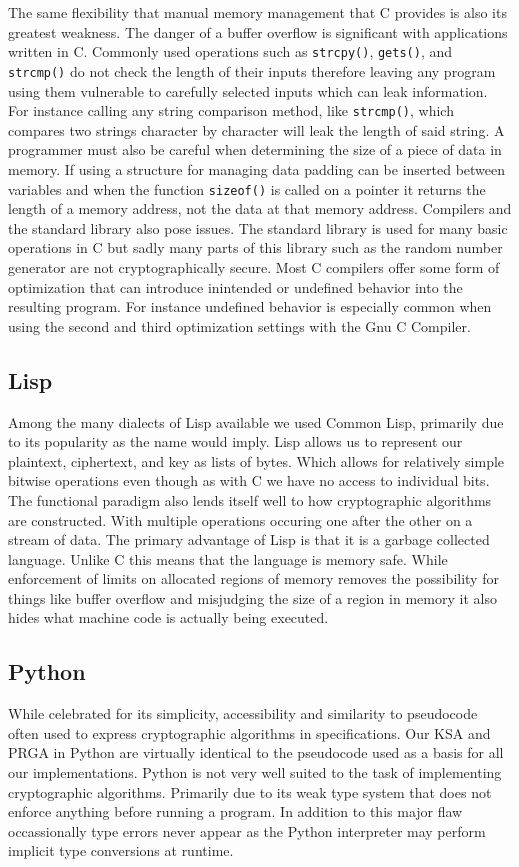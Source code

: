 The same flexibility that manual memory management that C provides is also its greatest weakness. The danger of a buffer overflow is significant with 
applications written in C. Commonly used operations such as \texttt{strcpy()}, \texttt{gets()}, and \texttt{strcmp()} do not check the length of 
their inputs therefore leaving any program using them vulnerable to carefully selected inputs which can leak information. For instance calling any 
string comparison method, like \texttt{strcmp()}, which compares two strings character by character will leak the length of said string. A programmer must also be 
careful when determining the size of a piece of data in memory. If using a structure for managing data padding can be inserted between variables and when the 
function \texttt{sizeof()} is called on a pointer it returns the length of a memory address, not the data at that memory address. Compilers and the standard 
library also pose issues. The standard library is used for many basic operations in C but sadly many parts of this library such as the random number generator 
are not cryptographically secure. Most C compilers offer some form of optimization that can introduce inintended or undefined behavior into the resulting 
program. For instance undefined behavior is especially common when using the second and third optimization settings with the Gnu C Compiler.

\subsection{Lisp}
Among the many dialects of Lisp available we used Common Lisp, primarily due to its popularity as the name would imply. Lisp allows us to represent our plaintext, 
ciphertext, and key as lists of bytes. Which allows for relatively simple bitwise operations even though as with C we have no access to individual bits. The functional
paradigm also lends itself well to how cryptographic algorithms are constructed. With multiple operations occuring one after the other on a stream of data. The primary 
advantage of Lisp is that it is a garbage collected language. Unlike C this means that the language is memory safe. While enforcement of limits on allocated 
regions of memory removes the possibility for things like buffer overflow and misjudging the size of a region in memory it also hides what machine code is actually 
being executed.

\subsection{Python}
While celebrated for its simplicity, accessibility and similarity to pseudocode often used to express cryptographic algorithms in specifications. Our KSA and PRGA 
in Python are virtually identical to the pseudocode used as a basis for all our implementations. Python is not very well suited to the task of implementing 
cryptographic algorithms. Primarily due to its weak type system that does not enforce anything before running a program. In addition to this major flaw occassionally type 
errors never appear as the Python interpreter may perform implicit type conversions at runtime.

